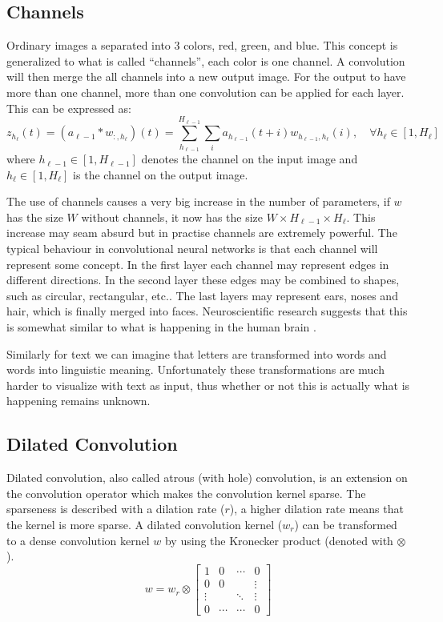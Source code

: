 \subsection{Channels}
Ordinary images a separated into 3 colors, red, green, and blue. This concept is generalized to what is called ``channels'', each color is one channel. A convolution will then merge the all channels into a new output image. For the output to have more than one channel, more than one convolution can be applied for each layer. This can be expressed as:
\begin{equation}
z_{h_\ell}(t) = (a_{\ell-1} * w_{:, h_\ell})(t) = \sum_{h_{\ell-1}}^{H_{\ell-1}} \sum_{i} a_{h_{\ell-1}}(t + i) w_{h_{\ell-1}, h_\ell}(i), \quad \forall h_\ell \in [1, H_\ell]
\end{equation}
where $h_{\ell-1} \in [1, H_{\ell-1}]$ denotes the channel on the input image and $h_\ell \in [1, H_\ell]$ is the channel on the output image.

The use of channels causes a very big increase in the number of parameters, if $w$ has the size $W$ without channels, it now has the size $W \times H_{\ell-1} \times H_\ell$. This increase may seam absurd but in practise channels are extremely powerful. The typical behaviour in convolutional neural networks is that each channel will represent some concept. In the first layer each channel may represent edges in different directions. In the second layer these edges may be combined to shapes, such as circular, rectangular, etc.. The last layers may represent ears, noses and hair, which is finally merged into faces. Neuroscientific research suggests that this is somewhat similar to what is happening in the human brain \cite[chapter 9.10]{deep-learning}.

Similarly for text we can imagine that letters are transformed into words and words into linguistic meaning. Unfortunately these transformations are much harder to visualize with text as input, thus whether or not this is actually what is happening remains unknown.

\subsection{Dilated Convolution}

Dilated convolution, also called atrous (with hole) convolution, is an extension on the convolution operator which makes the convolution kernel sparse. The sparseness is described with a dilation rate ($r$), a higher dilation rate means that the kernel is more sparse. A dilated convolution kernel ($w_r$) can be transformed to a dense convolution kernel $w$ by using the Kronecker product (denoted with $\otimes$).
\begin{equation}
w = w_r \otimes \begin{bmatrix}
1      & 0      & \cdots & 0      \\
0      & 0      &        & \vdots \\
\vdots &        & \ddots & \vdots \\
0      & \cdots & \cdots & 0
\end{bmatrix}
\end{equation}

